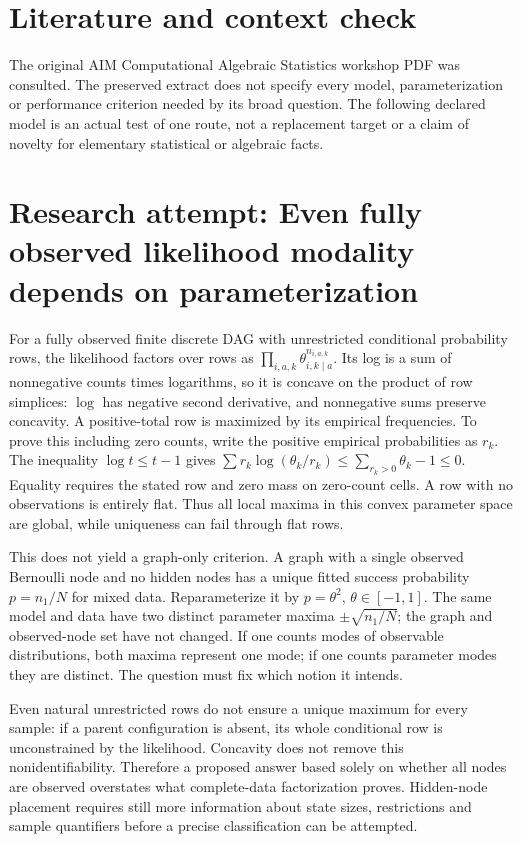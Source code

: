 \documentclass[11pt]{article}
\begin{document}
\section{Literature and context check}
The original AIM Computational Algebraic Statistics
 workshop PDF was consulted. The preserved extract does not specify every model,
 parameterization or performance criterion needed by its broad question. The
 following declared model is an actual test of one route, not a replacement
 target or a claim of novelty for elementary statistical or algebraic facts.
\section{Research attempt: Even fully observed likelihood modality depends on parameterization}
For a fully observed finite discrete DAG with unrestricted conditional
probability rows, the likelihood factors over rows as
$\prod_{i,a,k}\theta_{i,k\mid a}^{n_{i,a,k}}$.
Its log is a sum of nonnegative counts times logarithms, so it is concave
on the product of row simplices: $\log$ has negative second derivative, and
nonnegative sums preserve concavity. A positive-total row is maximized by
its empirical frequencies. To prove this including zero counts, write the
positive empirical probabilities as $r_k$. The inequality
$\log t\le t-1$ gives
$\sum r_k\log(\theta_k/r_k)\le\sum_{r_k>0}\theta_k-1\le0$.
Equality requires the stated row and zero mass on zero-count cells.
A row with no observations is entirely flat. Thus all local maxima in this
convex parameter space are global, while uniqueness can fail through flat rows.

This does not yield a graph-only criterion. A graph with a single observed
Bernoulli node and no hidden nodes has a unique fitted success probability
$p=n_1/N$ for mixed data. Reparameterize it by $p=\theta^2$,
$\theta\in[-1,1]$. The same model and data have two distinct parameter maxima
$\pm\sqrt{n_1/N}$; the graph and observed-node set have not changed. If one
counts modes of observable distributions, both maxima represent one mode;
if one counts parameter modes they are distinct. The question must fix which
notion it intends.

Even natural unrestricted rows do not ensure a unique maximum for every
sample: if a parent configuration is absent, its whole conditional row is
unconstrained by the likelihood. Concavity does not remove this nonidentifiability.
Therefore a proposed answer based solely on whether all nodes are observed
overstates what complete-data factorization proves. Hidden-node placement
requires still more information about state sizes, restrictions and sample
quantifiers before a precise classification can be attempted.
\end{document}
